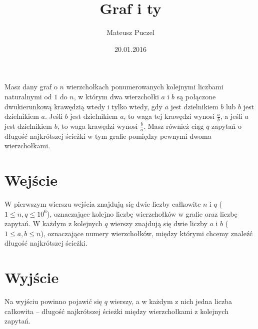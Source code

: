 \documentclass[zad,zawodnik,utf8]{sinol}
\title{Graf i ty}
\author{Mateusz Puczel} %
\date{20.01.2016}
\begin{document}
\begin{tasktext}%
Masz dany graf o $n$ wierzchołkach ponumerowanych kolejnymi liczbami naturalnymi od $1$ do $n$, w którym dwa wierzchołki $a$ i $b$ są połączone dwukierunkową krawędzią wtedy i tylko wtedy, gdy $a$ jest dzielnikiem $b$ lub $b$ jest dzielnikiem $a$.
Jeśli $b$ jest dzielnikiem $a$, to waga tej krawędzi wynosi $\frac{a}{b}$, a jeśli $a$ jest dzielnikiem $b$, to waga krawędzi wynosi $\frac{b}{a}$.
Masz również ciąg $q$ zapytań o długość najkrótszej ścieżki w tym grafie pomiędzy pewnymi dwoma wierzchołkami.

  \section{Wejście}
W pierwszym wierszu wejścia znajdują się dwie liczby całkowite $n$ i $q$ ($1 \leq n, q \leq 10^6$), oznaczające kolejno liczbę wierzchołków w grafie oraz liczbę zapytań.
W każdym z kolejnych $q$ wierszy znajdują się dwie liczby $a$ i $b$ ($1 \leq a, b \leq n$), oznaczające numery wierzchołków, między którymi chcemy znaleźć długość najkrótszej ścieżki.
  \section{Wyjście}
Na wyjściu powinno pojawić się $q$ wierszy, a w każdym z nich jedna liczba całkowita -- długość najkrótszej ścieżki między wierzchołkami z kolejnych zapytań. 
  \makecompactexample

\end{tasktext}
\end{document}
